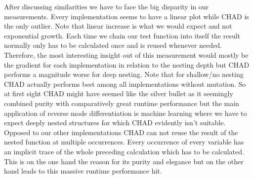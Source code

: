 After discussing similarities we have to face the big disparity in our measurements. Every implementation seems to have a linear plot while CHAD is the only outlier. Note that linear increase is what we would expect and not exponential growth. Each time we chain our test function into itself the result normally only has to be calculated once and is reused whenever needed. Therefore, the most interesting insight out of this measurement would mostly be the gradient for each implementation in relation to the nesting depth but CHAD performs a magnitude worse for deep nesting. Note that for shallow/no nesting CHAD actually performs best among all implementations without mutation. So at first sight CHAD might have seemed like the silver bullet as it seemingly combined purity with comparatively great runtime performance but the main application of reverse mode differentiation is machine learning where we have to expect deeply nested structures for which CHAD evidently isn't suitable. Opposed to our other implementations CHAD can not reuse the result of the nested function at multiple occurrences. Every occurrence of every variable has an implicit trace of the whole preceding calculation which has to be calculated. This is on the one hand the reason for its purity and elegance but on the other hand leads to this massive runtime performance hit.

